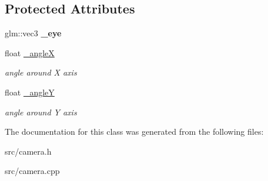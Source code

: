 \subsection*{Protected Attributes}
\begin{DoxyCompactItemize}
\item 
\hypertarget{class_perspective_camera_abd8e00fd34a5b51b431fb8d32196fe20}{}glm\+::vec3 {\bfseries \+\_\+eye}\label{class_perspective_camera_abd8e00fd34a5b51b431fb8d32196fe20}

\item 
\hypertarget{class_perspective_camera_a789547758df18f7fdc872faf871d085f}{}float \hyperlink{class_perspective_camera_a789547758df18f7fdc872faf871d085f}{\+\_\+angle\+X}\label{class_perspective_camera_a789547758df18f7fdc872faf871d085f}

\begin{DoxyCompactList}\small\item\em angle around X axis \end{DoxyCompactList}\item 
\hypertarget{class_perspective_camera_a09566695cfe277257cde24cb917e9328}{}float \hyperlink{class_perspective_camera_a09566695cfe277257cde24cb917e9328}{\+\_\+angle\+Y}\label{class_perspective_camera_a09566695cfe277257cde24cb917e9328}

\begin{DoxyCompactList}\small\item\em angle around Y axis \end{DoxyCompactList}\end{DoxyCompactItemize}


The documentation for this class was generated from the following files\+:\begin{DoxyCompactItemize}
\item 
src/camera.\+h\item 
src/camera.\+cpp\end{DoxyCompactItemize}
